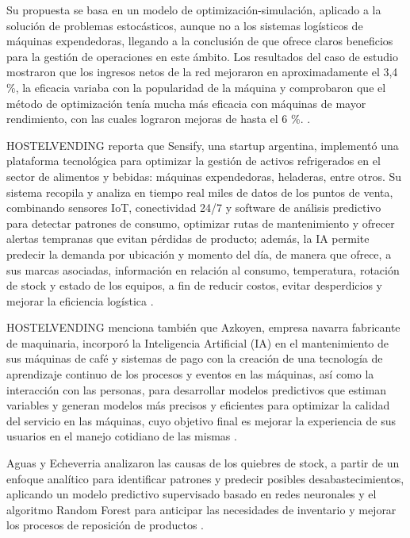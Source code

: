 Su propuesta se basa en un modelo de optimización-simulación, aplicado a la solución de problemas estocásticos, aunque no a los sistemas logísticos de máquinas expendedoras, llegando a la conclusión de que ofrece claros beneficios para la gestión de operaciones en este ámbito. Los resultados del caso de estudio mostraron que los ingresos netos de la red mejoraron en aproximadamente el 3,4 \%, la eficacia variaba con la popularidad de la máquina y comprobaron que el método de optimización tenía mucha más eficacia con máquinas de mayor rendimiento, con las cuales lograron mejoras de hasta el 6 \%. \citep{grzybowska2020}.

HOSTELVENDING reporta que Sensify, una startup argentina, implementó una plataforma tecnológica para optimizar la gestión de activos refrigerados en el sector de alimentos y bebidas: máquinas expendedoras, heladeras, entre otros. Su sistema recopila y analiza en tiempo real miles de datos de los puntos de venta, combinando sensores IoT, conectividad 24/7 y software de análisis predictivo para detectar patrones de consumo, optimizar rutas de mantenimiento y ofrecer alertas tempranas que evitan pérdidas de producto; además, la IA permite predecir la demanda por ubicación y momento del día, de manera que ofrece, a sus marcas asociadas, información en relación al consumo, temperatura, rotación de stock y estado de los equipos, a fin de reducir costos, evitar desperdicios y mejorar la eficiencia logística \citep{hostelvending2025}.

HOSTELVENDING menciona también que Azkoyen, empresa navarra fabricante de maquinaria, incorporó la Inteligencia Artificial (IA) en el mantenimiento de sus máquinas de café y sistemas de pago con la creación de una tecnología de aprendizaje continuo de los procesos y eventos en las máquinas, así como la interacción con las personas, para desarrollar modelos predictivos que estiman variables y generan modelos más precisos y eficientes para optimizar la calidad del servicio en las máquinas, cuyo objetivo final es mejorar la experiencia de sus usuarios en el manejo cotidiano de las mismas \citep{hostelvending2024}.

Aguas y Echeverria analizaron las causas de los quiebres de stock, a partir de un enfoque analítico para identificar patrones y predecir posibles desabastecimientos, aplicando un modelo predictivo supervisado basado en redes neuronales y el algoritmo Random Forest para anticipar las necesidades de inventario y mejorar los procesos de reposición de productos \citep{aguas2025}.

